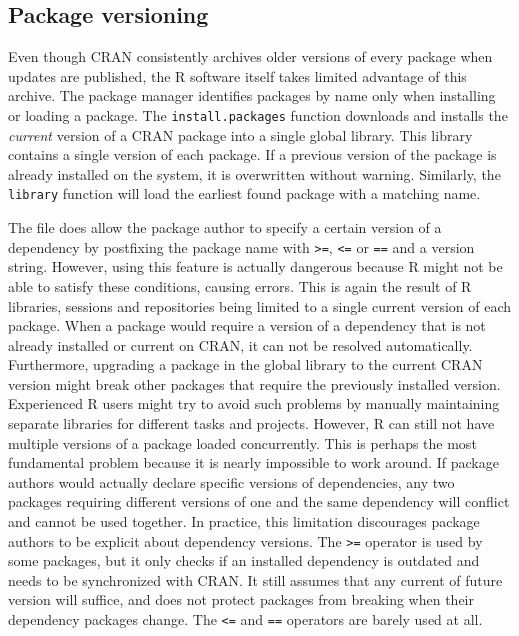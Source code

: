 \subsection{Package versioning}

Even though CRAN consistently archives older versions of every package when
updates are published, the R software itself takes limited advantage of this
archive. The package manager identifies packages by name only when installing
or loading a package. The \texttt{install.packages} function downloads and
installs the \emph{current} version of a CRAN package into a single global
library. This library contains a single version of each package. If a previous
version of the package is already installed on the system, it is overwritten
without warning. Similarly, the \texttt{library} function will load the earliest
found package with a matching name.

The  file does allow the package author to specify a certain
version of a dependency by postfixing the package name with \texttt{>=}, \texttt{<=} or
\texttt{==} and a version string. However, using this feature is actually dangerous
because R might not be able to satisfy these conditions, causing errors. This is
again the result of R libraries, sessions and repositories being limited to a
single current version of each package. When a package would require a version
of a dependency that is not already installed or current on CRAN, it can not be
resolved automatically. Furthermore, upgrading a package in the global library
to the current CRAN version might break other packages that require the
previously installed version. Experienced R users might try to avoid such
problems by manually maintaining separate libraries for different tasks and
projects. However, R can still not have multiple versions of a package loaded
concurrently. This is perhaps the most fundamental problem because it is nearly
impossible to work around. If package authors would actually declare specific
versions of dependencies, any two packages requiring different versions of
one and the same dependency will conflict and cannot be used together. In
practice, this limitation discourages package authors to be explicit about
dependency versions. The \texttt{>=} operator is used by some packages, but
it only checks if an installed dependency is outdated and needs to be
synchronized with CRAN. It still assumes that any current of future version will
suffice, and does not protect packages from breaking when their dependency
packages change. The \texttt{<=} and \texttt{==} operators are barely used at
all.

